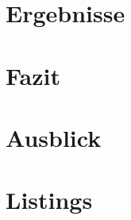 \documentclass[m,twoside,intern,palatino]{cgBA}
\begin{document}
\section{Ergebnisse}

	
	
\section{Fazit}

	

\section{Ausblick}
	\label{sec:ausblick}
	


	

	
	
	
\appendix
\section{Listings}
	\label{append:Listings}
	
\clearpage




\end{document}
